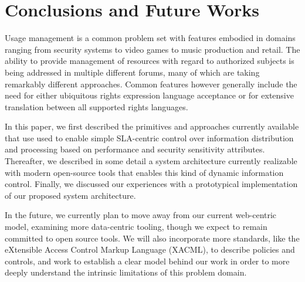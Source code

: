 \documentclass{sig-alternate}
\begin{document}
\section{Conclusions and Future Works}
Usage management is a common problem set with features embodied in domains ranging from security systems to video games to music production and retail.  The ability to provide management of resources with regard to authorized subjects is being addressed in multiple different forums, many of which are taking remarkably different approaches.  Common features however generally include the need for either ubiquitous rights expression language acceptance or for extensive translation between all supported rights languages.

In this paper, we first described the primitives and approaches currently available that use used to enable simple SLA-centric control over information distribution and processing based on performance and security sensitivity attributes.  Thereafter, we described in some detail a system architecture currently realizable with modern open-source tools that enables this kind of dynamic information control.  Finally, we discussed our experiences with a prototypical implementation of our proposed system architecture.

In the future, we currently plan to move away from our current web-centric model, examining more data-centric tooling, though we expect to remain committed to open source tools.  We will also incorporate more standards, like the eXtensible Access Control Markup Language (XACML), to describe policies and controls, and work to establish a clear model behind our work in order to more deeply understand the intrinsic limitations of this problem domain.



\end{document}
